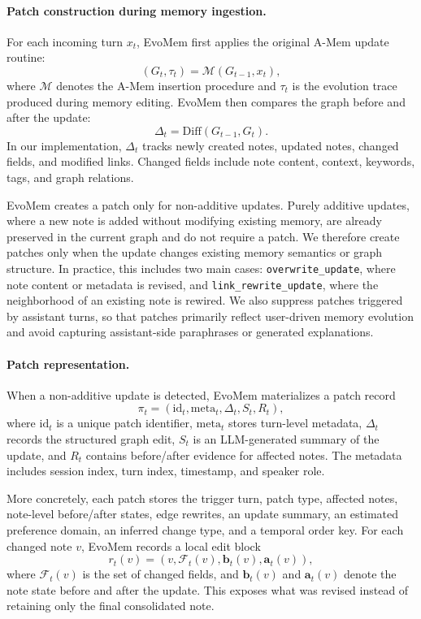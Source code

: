 \documentclass{llmxive}
\begin{document}
\paragraph{Patch construction during memory ingestion.}
For each incoming turn $x_t$, EvoMem first applies the original A-Mem update routine:
\[
(G_t,\tau_t)=\mathcal{M}(G_{t-1},x_t),
\]
where $\mathcal{M}$ denotes the A-Mem insertion procedure and $\tau_t$ is the evolution trace produced during memory editing. EvoMem then compares the graph before and after the update:
\[
\Delta_t=\mathrm{Diff}(G_{t-1},G_t).
\]
In our implementation, $\Delta_t$ tracks newly created notes, updated notes, changed fields, and modified links. Changed fields include note content, context, keywords, tags, and graph relations.

EvoMem creates a patch only for non-additive updates. Purely additive updates, where a new note is added without modifying existing memory, are already preserved in the current graph and do not require a patch. We therefore create patches only when the update changes existing memory semantics or graph structure. In practice, this includes two main cases: \texttt{overwrite\_update}, where note content or metadata is revised, and \texttt{link\_rewrite\_update}, where the neighborhood of an existing note is rewired. We also suppress patches triggered by assistant turns, so that patches primarily reflect user-driven memory evolution and avoid capturing assistant-side paraphrases or generated explanations.

\paragraph{Patch representation.}
When a non-additive update is detected, EvoMem materializes a patch record
\[
\pi_t =
\left(
\mathrm{id}_t,
\mathrm{meta}_t,
\Delta_t,
S_t,
R_t
\right),
\]
where $\mathrm{id}_t$ is a unique patch identifier, $\mathrm{meta}_t$ stores turn-level metadata, $\Delta_t$ records the structured graph edit, $S_t$ is an LLM-generated summary of the update, and $R_t$ contains before/after evidence for affected notes. The metadata includes session index, turn index, timestamp, and speaker role.

More concretely, each patch stores the trigger turn, patch type, affected notes, note-level before/after states, edge rewrites, an update summary, an estimated preference domain, an inferred change type, and a temporal order key. For each changed note $v$, EvoMem records a local edit block
\[
r_t(v)=\left(v,\mathcal{F}_t(v),\mathbf{b}_t(v),\mathbf{a}_t(v)\right),
\]
where $\mathcal{F}_t(v)$ is the set of changed fields, and $\mathbf{b}_t(v)$ and $\mathbf{a}_t(v)$ denote the note state before and after the update. This exposes what was revised instead of retaining only the final consolidated note.
\end{document}
